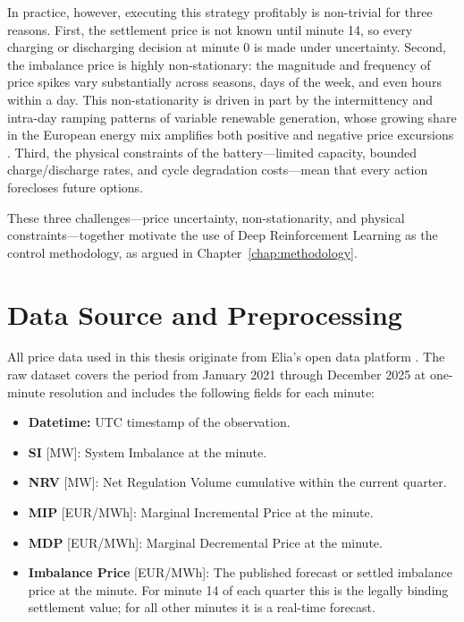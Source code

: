 In practice, however, executing this strategy profitably is non-trivial for three reasons. First, the settlement price is not known until minute 14, so every charging or discharging decision at minute 0 is made under uncertainty. Second, the imbalance price is highly non-stationary: the magnitude and frequency of price spikes vary substantially across seasons, days of the week, and even hours within a day. This non-stationarity is driven in part by the intermittency and intra-day ramping patterns of variable renewable generation, whose growing share in the European energy mix amplifies both positive and negative price excursions \cite{[search: intermittent renewable energy electricity price volatility non-stationarity spot market]}. Third, the physical constraints of the battery—limited capacity, bounded charge/discharge rates, and cycle degradation costs—mean that every action forecloses future options.

These three challenges—price uncertainty, non-stationarity, and physical constraints—together motivate the use of Deep Reinforcement Learning as the control methodology, as argued in Chapter~\ref{chap:methodology}.

\section{Data Source and Preprocessing}
\label{sec:data-source}

All price data used in this thesis originate from Elia's open data platform \cite{[search: Elia open data platform Belgium imbalance price historical download]}. The raw dataset covers the period from January 2021 through December 2025 at one-minute resolution and includes the following fields for each minute:

\begin{itemize}
    \item \textbf{Datetime:} UTC timestamp of the observation.
    \item \textbf{SI} [MW]: System Imbalance at the minute.
    \item \textbf{NRV} [MW]: Net Regulation Volume cumulative within the current quarter.
    \item \textbf{MIP} [EUR/MWh]: Marginal Incremental Price at the minute.
    \item \textbf{MDP} [EUR/MWh]: Marginal Decremental Price at the minute.
    \item \textbf{Imbalance Price} [EUR/MWh]: The published forecast or settled imbalance price at the minute. For minute 14 of each quarter this is the legally binding settlement value; for all other minutes it is a real-time forecast.
\end{itemize}


